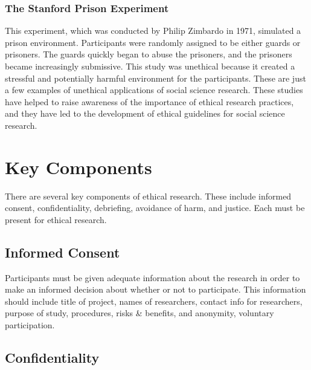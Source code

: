 \documentclass[
  b5paper]{book}
\begin{document}
\hypertarget{the-stanford-prison-experiment}{%
\subsubsection*{The Stanford Prison Experiment}\label{the-stanford-prison-experiment}}

This experiment, which was conducted by Philip Zimbardo in 1971, simulated a prison environment. Participants were randomly assigned to be either guards or prisoners. The guards quickly began to abuse the prisoners, and the prisoners became increasingly submissive. This study was unethical because it created a stressful and potentially harmful environment for the participants. These are just a few examples of unethical applications of social science research. These studies have helped to raise awareness of the importance of ethical research practices, and they have led to the development of ethical guidelines for social science research.

\hypertarget{key-components}{%
\section{Key Components}\label{key-components}}

There are several key components of ethical research. These include informed consent, confidentiality, debriefing, avoidance of harm, and justice. Each must be present for ethical research.

\hypertarget{informed-consent}{%
\subsection*{Informed Consent}\label{informed-consent}}

Participants must be given adequate information about the research in order to make an informed decision about whether or not to participate. This information should include title of project, names of researchers, contact info for researchers, purpose of study, procedures, risks \& benefits, and anonymity, voluntary participation.

\hypertarget{confidentiality}{%
\subsection*{Confidentiality}\label{confidentiality}}
\end{document}
